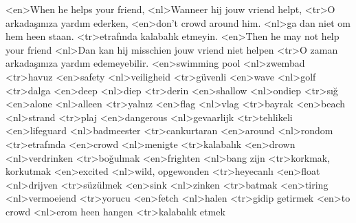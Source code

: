 <en>When he helps your friend,
<nl>Wanneer hij jouw vriend helpt,
<tr>O arkadaşınıza yardım ederken,
<en>don’t crowd around him.
<nl>ga dan niet om hem heen staan.
<tr>etrafında kalabalık etmeyin.
<en>Then he may not help your friend
<nl>Dan kan hij misschien jouw vriend niet helpen
<tr>O zaman arkadaşınıza yardım edemeyebilir.
<en>swimming pool
<nl>zwembad
<tr>havuz
<en>safety
<nl>veiligheid
<tr>güvenli
<en>wave
<nl>golf
<tr>dalga
<en>deep
<nl>diep
<tr>derin
<en>shallow
<nl>ondiep
<tr>sığ
<en>alone
<nl>alleen
<tr>yalnız
<en>flag
<nl>vlag
<tr>bayrak
<en>beach
<nl>strand
<tr>plaj
<en>dangerous
<nl>gevaarlijk
<tr>tehlikeli
<en>lifeguard
<nl>badmeester
<tr>cankurtaran
<en>around
<nl>rondom
<tr>etrafında
<en>crowd
<nl>menigte
<tr>kalabalık
<en>drown
<nl>verdrinken
<tr>boğulmak
<en>frighten
<nl>bang zijn
<tr>korkmak, korkutmak
<en>excited
<nl>wild, opgewonden
<tr>heyecanlı
<en>float
<nl>drijven
<tr>süzülmek
<en>sink
<nl>zinken
<tr>batmak
<en>tiring
<nl>vermoeiend
<tr>yorucu
<en>fetch
<nl>halen
<tr>gidip getirmek
<en>to crowd
<nl>erom heen hangen
<tr>kalabalık etmek
